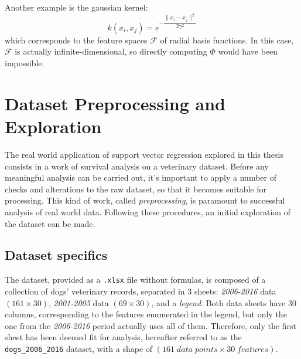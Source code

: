 \documentclass[12pt]{report}
\begin{document}
Another example is the gaussian kernel:
\begin{equation} \label{gausskernel}
k(x_{i},x_{j}) = e^{-\dfrac{\| x_{i}-x_{j} \|^{2}}{2\gamma^{2}}}
\end{equation}
which corresponds to the feature spaces $ \mathcal{F} $ of radial basis functions. In this case, $ \mathcal{F} $ is actually infinite-dimensional, so directly computing $ \Phi $ would have been impossible.

\chapter{Dataset Preprocessing and Exploration}
\label{chprepr}
The real world application of support vector regression explored in this thesis consists in a work of survival analysis on a veterinary dataset. Before any meaningful analysis can be carried out, it's important to apply a number of checks and alterations to the raw dataset, so that it becomes suitable for processing. This kind of work, called \textit{preprocessing}, is paramount to successful analysis of real world data. Following these procedures, an initial exploration of the dataset can be made.

\section{Dataset specifics}
The dataset, provided as a \texttt{.xlsx} file without formulas, is composed of a collection of dogs' veterinary records, separated in 3 sheets: \textit{2006-2016} data $ (161 \times 30) $, \textit{2001-2005} data $ (69 \times 30) $, and a \textit{legend}. Both data sheets have 30 columns, corresponding to the features enumerated in the legend, but only the one from the \textit{2006-2016} period actually uses all of them. Therefore, only the first sheet has been deemed fit for analysis, hereafter referred to as the \texttt{dogs\_2006\_2016} dataset, with a shape of $ (161\; data\; points \times 30\; features) $.
\end{document}
